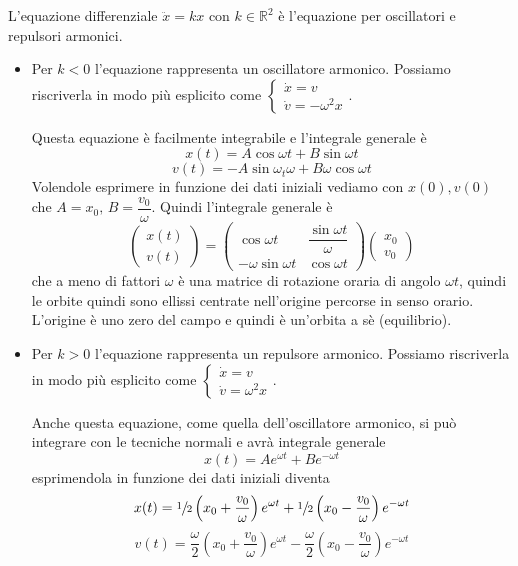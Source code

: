 \documentclass[11pt,a4paper,twoside]{book}
\newenvironment{esempio}[1][Esempio]{ 
  \begin{center}\begin{tcolorbox}[
  title={#1:\\},
  width=0.9\linewidth,
  flush right,
  enhanced jigsaw, 
  colback=white, 
  frame hidden, 
  sharpish corners, arc=3mm,
  borderline west = {1pt}{0pt}{gray},
  borderline south = {1pt}{0pt}{gray},
  coltitle=black, 
  fonttitle=\small\bfseries, 
  attach title to upper, 
  breakable,
  top=2.5pt, bottom=0.3pt]\small
  }{
 \normalsize \end{tcolorbox}\end{center}
}
\theoremstyle{esss}
\theoremstyle{dotless}
\numberwithin{equation}{section} %
\begin{document}
\begin{esempio}[Oscillatore e Repulsore armonico]
L'equazione differenziale $\ddot{x}=kx$ con $k\in\mathbb{R}^2$ è l'equazione per oscillatori e repulsori armonici.


\begin{itemize} 
\item Per $k<0$ l'equazione rappresenta un oscillatore armonico. Possiamo riscriverla in modo più esplicito come $\begin{cases}\dot{x}=v \\ \dot{v}=-\omega^2 x  \end{cases}$.

Questa equazione è facilmente integrabile e l'integrale generale è 
\begin{equation}
x(t)=A\cos{\omega t} +B\sin{\omega t}
\end{equation}
\[
v(t)=-A\sin{\omega_t}\omega+B\omega\cos{\omega t}
\]
Volendole esprimere in funzione dei dati iniziali vediamo con $x(0),v(0)$ che $A=x_0,\, B=\dfrac{v_0}{\omega}$. Quindi l'integrale generale è
\[
\left(\begin{array}{c} x(t) \\ v(t) \end{array}\right) = \left(\begin{array}{cc} \cos{\omega t} & \dfrac{\sin{\omega t}}{\omega} \\ -\omega\sin{\omega t} & \cos{\omega t} \end{array}\right) \left(\begin{array}{c} x_0 \\ v_0  \end{array}\right)
\]
che a meno di fattori $\omega$ è una matrice di rotazione oraria di angolo $\omega t$, quindi le orbite quindi sono ellissi centrate nell'origine percorse in senso orario.
L'origine è uno zero del campo e quindi è un'orbita a sè (equilibrio).

\item Per $k>0$ l'equazione rappresenta un repulsore armonico. Possiamo riscriverla in modo più esplicito come $\begin{cases}\dot{x}=v \\ \dot{v}=\omega^2 x  \end{cases}$.

Anche questa equazione, come quella dell'oscillatore armonico, si può integrare con le tecniche normali e avrà integrale generale
\begin{equation}
x(t)=Ae^{\omega t} + Be^{-\omega t}
\end{equation}
esprimendola in funzione dei dati iniziali diventa
\[
x(t)=\sfrac{1}{2} \left(x_0 +\dfrac{v_0}{\omega} \right)e^{\omega t} +\sfrac{1}{2} \left(x_0 - \dfrac{v_0}{\omega}\right)e^{-\omega t}
\]
\[
v(t)=\dfrac{\omega}{2}\left( x_0+\dfrac{v_0}{\omega}\right) e^{\omega t} -\dfrac{\omega}{2}\left(x_0-\dfrac{v_0}{\omega}\right)e^{-\omega t}
\]


\end{itemize}
\end{esempio}
\end{document}
